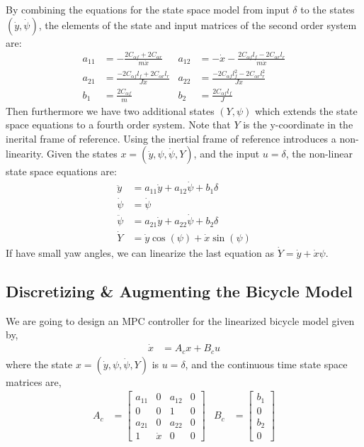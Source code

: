 \documentclass{article}
\begin{document}
By combining the equations for the state space model from input $\delta$ to the states $(\dot{y}, \dot{\psi})$, the
elements of the state and input matrices of the second order system are:
\begin{align}
    a_{11} &= -\frac{2C_{\alpha f} + 2C_{\alpha r}}{m\dot{x}} &
    a_{12} &= -\dot{x} - \frac{2C_{\alpha f}l_f - 2C_{\alpha r}l_r}{m\dot{x}} \\
    a_{21} &= \frac{-2C_{\alpha f}l_f + 2C_{\alpha r}l_r}{J\dot{x}} &
    a_{22} &= \frac{-2C_{\alpha f}l_f^2 - 2C_{\alpha r}l_r^2}{J\dot{x}} \\
    b_{1} &= \frac{2C_{\alpha f}}{m} &
    b_{2} &= \frac{2C_{\alpha f}l_f}{J}
\end{align}
Then furthermore we have two additional states $(Y, \psi)$ which extends the state space equations to a fourth order
system. Note that $Y$ is the y-coordinate in the inerital frame of reference. Using the inertial frame of reference
introduces a non-linearity. Given the states $x = (\dot{y}, \psi, \dot{\psi}, Y)$, and the input $u=\delta$, the
non-linear state space equations are:
\begin{align}
    \ddot{y} &= a_{11}\dot{y} + a_{12}\dot{\psi} + b_1\delta \\
    \dot{\psi} &= \dot{\psi} \\
    \ddot{\psi} &= a_{21}\dot{y} + a_{22}\dot{\psi} + b_2\delta \\
    \dot{Y} &= \dot{y}\cos(\psi) + \dot{x}\sin(\psi)
\end{align}
If have small yaw angles, we can linearize the last equation as $\dot{Y} = \dot{y} + \dot{x}\psi$.

\subsection{Discretizing \& Augmenting the Bicycle Model}

We are going to design an MPC controller for the linearized bicycle model given by,
\begin{align}
    \dot{x} &= A_cx + B_cu
\end{align}
where the state $x = (\dot{y}, \psi, \dot{\psi}, Y)$ is $u = \delta$, and the continuous time state space matrices are,
\begin{align}
    A_c &= \begin{bmatrix}
        a_{11} & 0 & a_{12} & 0 \\
        0 & 0 & 1 & 0 \\
        a_{21} & 0 & a_{22} & 0 \\
        1 & \dot{x} & 0 & 0
    \end{bmatrix} &
    B_c &= \begin{bmatrix}
        b_1 \\ 0 \\ b_2 \\ 0
    \end{bmatrix}
\end{align}
\end{document}
